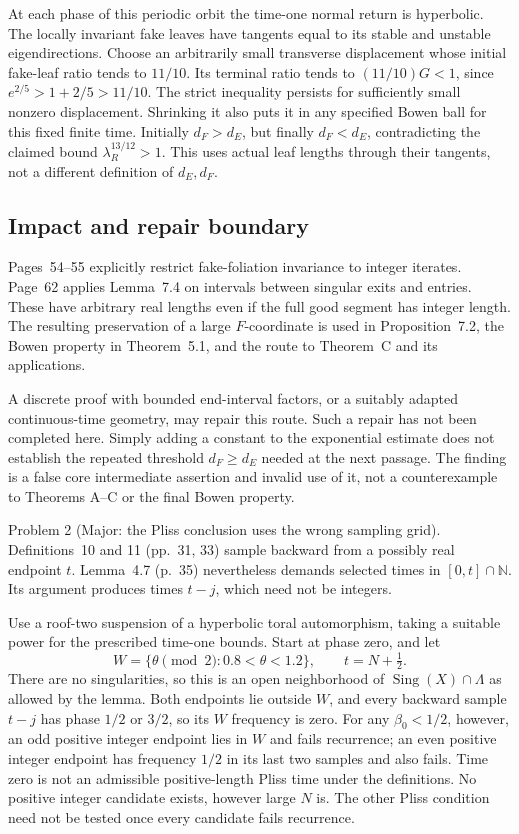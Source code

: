 \documentclass[10pt]{article}
\begin{document}
At each phase of this periodic orbit the time-one normal return is hyperbolic. The locally invariant fake leaves have tangents equal to its stable and unstable eigendirections. Choose an arbitrarily small transverse displacement whose initial fake-leaf ratio tends to \(11/10\). Its terminal ratio tends to \((11/10)G<1\), since \(e^{2/5}>1+2/5>11/10\). The strict inequality persists for sufficiently small nonzero displacement. Shrinking it also puts it in any specified Bowen ball for this fixed finite time. Initially \(d_F>d_E\), but finally \(d_F<d_E\), contradicting the claimed bound \(\lambda_R^{13/12}>1\). This uses actual leaf lengths through their tangents, not a different definition of \(d_E,d_F\).\par
\subsection*{Impact and repair boundary}
Pages 54–55 explicitly restrict fake-foliation invariance to integer iterates. Page 62 applies Lemma 7.4 on intervals between singular exits and entries. These have arbitrary real lengths even if the full good segment has integer length. The resulting preservation of a large \(F\)-coordinate is used in Proposition 7.2, the Bowen property in Theorem 5.1, and the route to Theorem C and its applications.\par
A discrete proof with bounded end-interval factors, or a suitably adapted continuous-time geometry, may repair this route. Such a repair has not been completed here. Simply adding a constant to the exponential estimate does not establish the repeated threshold \(d_F\ge d_E\) needed at the next passage. The finding is a false core intermediate assertion and invalid use of it, not a counterexample to Theorems A–C or the final Bowen property.\par
Problem 2 (Major: the Pliss conclusion uses the wrong sampling grid).  Definitions 10 and 11 (pp. 31, 33) sample backward from a possibly real endpoint \(t\). Lemma 4.7 (p. 35) nevertheless demands selected times in \([0,t]\cap\mathbb N\). Its argument produces times \(t-j\), which need not be integers.\par
Use a roof-two suspension of a hyperbolic toral automorphism, taking a suitable power for the prescribed time-one bounds. Start at phase zero, and let \[W=\{\theta\pmod2:0.8<\theta<1.2\},\qquad t=N+\tfrac12 .\] There are no singularities, so this is an open neighborhood of \(\operatorname{Sing}(X)\cap\Lambda\) as allowed by the lemma. Both endpoints lie outside \(W\), and every backward sample \(t-j\) has phase \(1/2\) or \(3/2\), so its \(W\) frequency is zero. For any \(\beta_0<1/2\), however, an odd positive integer endpoint lies in \(W\) and fails recurrence; an even positive integer endpoint has frequency \(1/2\) in its last two samples and also fails. Time zero is not an admissible positive-length Pliss time under the definitions. No positive integer candidate exists, however large \(N\) is. The other Pliss condition need not be tested once every candidate fails recurrence.\par
\end{document}
